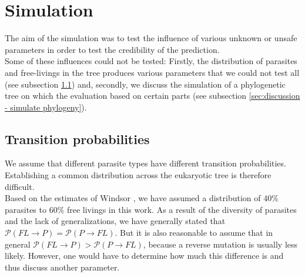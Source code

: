   \section{Simulation} \label{sec:discussion - simulation}
    The aim of the simulation was to test the influence of various unknown or unsafe parameters in 
      order to test the credibility of the prediction. \\
    Some of these influences could not be tested: Firstly, the distribution of parasites and 
      free-livings in the tree produces various parameters that we could not test all (see subsection 
      \ref{sec:discussion - transition probabilities}) and, secondly, we discuss the simulation of a 
      phylogenetic tree on which the evaluation based on certain parts (see subsection 
      \ref{sec:discussion - simulate phylogeny}).

    \subsection{Transition probabilities} \label{sec:discussion - transition probabilities}
      We assume that different parasite types have different transition probabilities. Establishing a 
        common distribution across the eukaryotic tree is therefore difficult. \\
      Based on the estimates of Windsor \cite{Windsor1998}, we have assumed a distribution of 40\% 
        parasites to 60\% free livings in this work. As a result of the diversity of parasites and the 
        lack of generalizations, we have generally stated that 
        $\mathcal{P}(FL \rightarrow P) = \mathcal{P}(P \rightarrow FL)$. But it is also reasonable to 
        assume that in general $\mathcal{P}(FL \rightarrow P) > \mathcal{P}(P \rightarrow FL)$, because 
        a reverse mutation is usually less likely. However, one would have to determine how much this 
        difference is and thus discuss another parameter. \\
      
